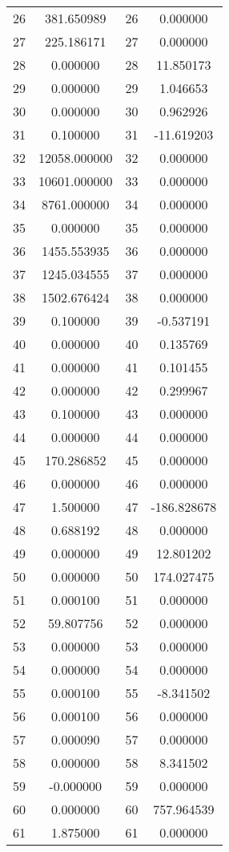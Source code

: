 \documentclass[12pt]{article}
\begin{document}
\begin{longtable}{@{}cccc@{}}
26 & 381.650989 & 26 & 0.000000 \\
27 & 225.186171 & 27 & 0.000000 \\
28 & 0.000000 & 28 & 11.850173 \\
29 & 0.000000 & 29 & 1.046653 \\
30 & 0.000000 & 30 & 0.962926 \\
31 & 0.100000 & 31 & -11.619203 \\
32 & 12058.000000 & 32 & 0.000000 \\
33 & 10601.000000 & 33 & 0.000000 \\
34 & 8761.000000 & 34 & 0.000000 \\
35 & 0.000000 & 35 & 0.000000 \\
36 & 1455.553935 & 36 & 0.000000 \\
37 & 1245.034555 & 37 & 0.000000 \\
38 & 1502.676424 & 38 & 0.000000 \\
39 & 0.100000 & 39 & -0.537191 \\
40 & 0.000000 & 40 & 0.135769 \\
41 & 0.000000 & 41 & 0.101455 \\
42 & 0.000000 & 42 & 0.299967 \\
43 & 0.100000 & 43 & 0.000000 \\
44 & 0.000000 & 44 & 0.000000 \\
45 & 170.286852 & 45 & 0.000000 \\
46 & 0.000000 & 46 & 0.000000 \\
47 & 1.500000 & 47 & -186.828678 \\
48 & 0.688192 & 48 & 0.000000 \\
49 & 0.000000 & 49 & 12.801202 \\
50 & 0.000000 & 50 & 174.027475 \\
51 & 0.000100 & 51 & 0.000000 \\
52 & 59.807756 & 52 & 0.000000 \\
53 & 0.000000 & 53 & 0.000000 \\
54 & 0.000000 & 54 & 0.000000 \\
55 & 0.000100 & 55 & -8.341502 \\
56 & 0.000100 & 56 & 0.000000 \\
57 & 0.000090 & 57 & 0.000000 \\
58 & 0.000000 & 58 & 8.341502 \\
59 & -0.000000 & 59 & 0.000000 \\
60 & 0.000000 & 60 & 757.964539 \\
61 & 1.875000 & 61 & 0.000000 \\

\end{longtable}
\end{document}
